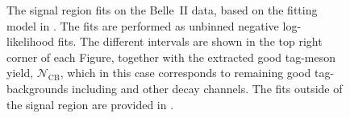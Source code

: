 \begin{figure}[htbp!]
{    }
    \caption{\label{fig:data_fits_signal}
    The \EB signal region fits on the Belle~II data, based on the fitting model in .
    The fits are performed as unbinned negative log-likelihood fits.
    The different \EB intervals are shown in the top right corner of each Figure, 
    together with the extracted good tag-\B meson yield, $\mathcal{N}_{\mathrm{CB}}$, which in this case corresponds to remaining good tag-\B backgrounds including \BtoXsgamma and other \BB decay channels.
    The fits outside of the signal region are provided in .
    }
\end{figure}

